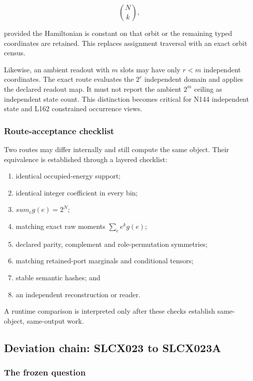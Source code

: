\[
\binom Nk,
\]

provided the Hamiltonian is constant on that orbit or the remaining
typed coordinates are retained. This replaces assignment traversal with
an exact orbit census.

Likewise, an ambient readout with \(m\) slots may have only \(r<m\)
independent coordinates. The exact route evaluates the \(2^r\)
independent domain and applies the declared readout map. It must not
report the ambient \(2^m\) ceiling as independent state count. This
distinction becomes critical for N144 independent state and L162
constrained occurrence views.

\subsubsection{Route-acceptance
checklist}\label{viii-ch03-route-acceptance-checklist}

Two routes may differ internally and still compute the same object.
Their equivalence is established through a layered checklist:

\begin{enumerate}
\def\labelenumi{\arabic{enumi}.}
\tightlist
\item
  identical occupied-energy support;
\item
  identical integer coefficient in every bin;
\item
  \(sum_e g(e)=2^N\);
\item
  matching exact raw moments \(\sum_e e^kg(e)\);
\item
  declared parity, complement and role-permutation symmetries;
\item
  matching retained-port marginals and conditional tensors;
\item
  stable semantic hashes; and
\item
  an independent reconstruction or reader.
\end{enumerate}

A runtime comparison is interpreted only after these checks establish
same-object, same-output work.

\subsection{Deviation chain: SLCX023 to
SLCX023A}\label{viii-ch03-deviation-chain-slcx023-to-slcx023a}

\subsubsection{The frozen question}\label{viii-ch03-the-frozen-question}

